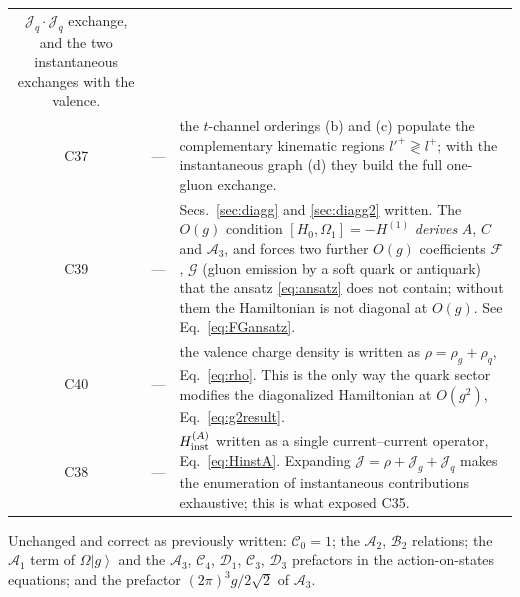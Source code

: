 \documentclass[11pt]{article}
\newcommand{\ket}[1]{\left|#1\right\rangle}
\newcommand{\OM}{\Omega}
\newcommand{\Jc}{\mathcal{J}}
\newcommand{\A}{\mathcal{A}}
\newcommand{\B}{\mathcal{B}}
\newcommand{\C}{\mathcal{C}}
\newcommand{\D}{\mathcal{D}}
\begin{document}
\begin{center}
\begin{longtable}{c>{\raggedright\arraybackslash}p{3.9cm}p{7.6cm}}
$\Jc_{q}\!\cdot\!\Jc_{q}$ exchange, and the two instantaneous exchanges with the valence.\\
C37 & --- & the $t$-channel orderings (b) and (c) populate the complementary kinematic regions
$l'^{+}\gtrless l^{+}$; with the instantaneous graph (d) they build the full one-gluon exchange.\\
C39 & --- & Secs.~\ref{sec:diagg} and \ref{sec:diagg2} written. The $O(g)$ condition
$[H_{0},\OM_{1}]=-H^{(1)}$ \emph{derives} $A$, $C$ and $\A_{3}$, and forces two further $O(g)$
coefficients $\mathcal F$, $\mathcal G$ (gluon emission by a soft quark or antiquark) that the
ansatz \eqref{eq:ansatz} does not contain; without them the Hamiltonian is not diagonal at
$O(g)$. See Eq.~\eqref{eq:FGansatz}.\\
C40 & --- & the valence charge density is written as $\rho=\rho_{g}+\rho_{q}$,
Eq.~\eqref{eq:rho}. This is the only way the quark sector modifies the diagonalized Hamiltonian
at $O(g^{2})$, Eq.~\eqref{eq:g2result}.\\
C38 & --- & $H^{(A)}_{\rm inst}$ written as a single current--current operator,
Eq.~\eqref{eq:HinstA}. Expanding $\Jc=\rho+\Jc_{g}+\Jc_{q}$ makes the enumeration of
instantaneous contributions exhaustive; this is what exposed C35.\\
\hline
\end{longtable}
\end{center}

\noindent
Unchanged and correct as previously written: $\C_{0}=1$; the $\A_{2}$, $\B_{2}$ relations; the
$\A_{1}$ term of $\OM\ket{g}$ and the $\A_{3}$, $\C_{4}$, $\D_{1}$, $\C_{3}$, $\D_{3}$ prefactors
in the action-on-states equations; and the prefactor $(2\pi)^{3}g/2\sqrt2$ of $\A_{3}$.
\end{document}
